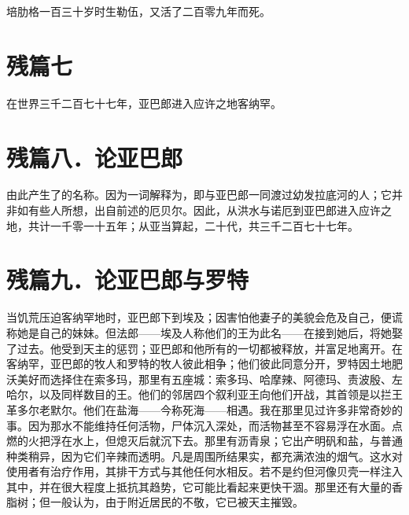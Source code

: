 培肋格一百三十岁时生勒伍，又活了二百零九年而死。\par


\section{残篇七}

在世界三千二百七十七年，亚巴郎进入应许之地客纳罕。\par


\section{残篇八．论亚巴郎}

由此产生了的名称。因为一词解释为，即与亚巴郎一同渡过幼发拉底河的人；它并非如有些人所想，出自前述的厄贝尔。因此，从洪水与诺厄到亚巴郎进入应许之地，共计一千零一十五年；从亚当算起，二十代，共三千二百七十七年。\par


\section{残篇九．论亚巴郎与罗特}

当饥荒压迫客纳罕地时，亚巴郎下到埃及；因害怕他妻子的美貌会危及自己，便谎称她是自己的妹妹。但法郎——埃及人称他们的王为此名——在接到她后，将她娶了过去。他受到天主的惩罚；亚巴郎和他所有的一切都被释放，并富足地离开。在客纳罕，亚巴郎的牧人和罗特的牧人彼此相争；他们彼此同意分开，罗特因土地肥沃美好而选择住在索多玛，那里有五座城：索多玛、哈摩辣、阿德玛、责波殷、左哈尔，以及同样数目的王。他们的邻居四个叙利亚王向他们开战，其首领是以拦王革多尔老默尔。他们在盐海——今称死海——相遇。我在那里见过许多非常奇妙的事。因为那水不能维持任何活物，尸体沉入深处，而活物甚至不容易浮在水面。点燃的火把浮在水上，但熄灭后就沉下去。那里有沥青泉；它出产明矾和盐，与普通种类稍异，因为它们辛辣而透明。凡是周围所结果实，都充满浓浊的烟气。这水对使用者有治疗作用，其排干方式与其他任何水相反。若不是约但河像贝壳一样注入其中，并在很大程度上抵抗其趋势，它可能比看起来更快干涸。那里还有大量的香脂树；但一般认为，由于附近居民的不敬，它已被天主摧毁。\par

